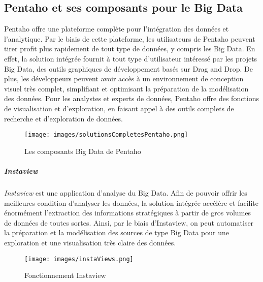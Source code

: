 \documentclass[12pt,a4wide,twoside]{report}
\begin{document}
	\subsection{Pentaho et ses composants pour le Big Data}
	Pentaho offre une plateforme complète pour l'intégration des données et l'analytique. Par le biais de cette plateforme, les utilisateurs de Pentaho peuvent tirer profit plus rapidement de tout type de données, y compris les Big Data.\newline
	En effet, la solution intégrée fournit à tout type d'utilisateur intéressé par les projets Big Data, des outils graphiques de développement basés sur Drag and Drop. De plus, les développeurs peuvent avoir accès à un environnement de conception visuel très complet, simplifiant et optimisant la préparation de la modélisation des données.\newline
Pour les analystes et experts de données, Pentaho offre des fonctions de visualisation et d'exploration, en faisant appel à des outils complets de recherche et d'exploration de données. \newline
\begin{figure}
\begin{center}
	\texttt{[image: images/solutionsCompletesPentaho.png]}
\end{center}
\caption{Les composants Big Data de Pentaho}
\end{figure}
\newpage

\subparagraph{Instaview \newline}
\emph{Instaview} est une application d'analyse du Big Data.
Afin de pouvoir offrir les meilleures condition d'analyser les données, la solution intégrée accélère et facilite énormément l'extraction des informations stratégiques à partir de gros volumes de données de toutes sortes. \newline
Ainsi, par le biais d'Instaview, on peut automatiser la préparation et la modélisation des sources de type Big Data pour une exploration et une visualisation très claire des données.
\begin{figure}[!h]
\begin{center}
		\texttt{[image: images/instaViews.png]}
\end{center}
\caption{Fonctionnement Instaview}
\end{figure}
\newpage
\end{document}
